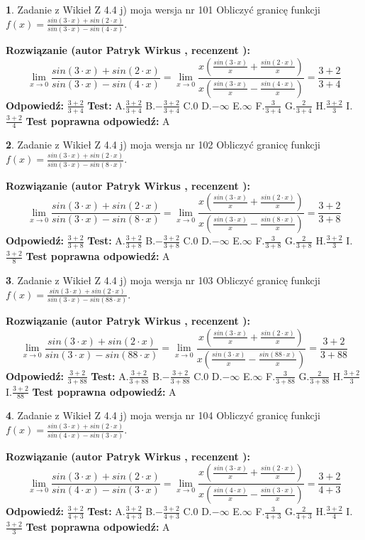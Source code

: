 \documentclass[12pt, a4paper]{article}
\theoremstyle{definition} %
\newtheorem{zad}{}
\newcommand{\zadStart}[1]{\begin{zad}#1\newline}
\newcommand{\zadStop}{\end{zad}}
\newcommand{\rozwStart}[2]{\noindent \textbf{Rozwiązanie (autor #1 , recenzent #2): }\newline}
\newcommand{\rozwStop}{\newline}
\newcommand{\odpStart}{\noindent \textbf{Odpowiedź:}\newline}
\newcommand{\odpStop}{\newline}
\newcommand{\testStart}{\noindent \textbf{Test:}\newline}
\newcommand{\testStop}{\newline}
\newcommand{\kluczStart}{\noindent \textbf{Test poprawna odpowiedź:}\newline}
\newcommand{\kluczStop}{\newline}
\begin{document}
\zadStart{Zadanie z Wikieł Z 4.4 j) moja wersja nr 101}
Obliczyć granicę funkcji $f(x)=\frac{sin(3\cdot x) +sin(2\cdot x)}{sin(3\cdot x) -sin(4\cdot x)}$.
\zadStop
\rozwStart{Patryk Wirkus}{}
$$\lim\limits_{x\to 0}\frac{sin(3\cdot x) +sin(2\cdot x)}{sin(3\cdot x) -sin(4\cdot x)}=\lim\limits_{x\to 0}\frac{x(\frac{sin(3\cdot x)}{x}+\frac{sin(2\cdot x)}{x})}{x(\frac{sin(3\cdot x)}{x}-\frac{sin(4\cdot x)}{x})}=\frac{3+2}{3+4}$$
\rozwStop
\odpStart
$\frac{3+2}{3+4}$
\odpStop
\testStart
A.$\frac{3+2}{3+4}$
B.$-\frac{3+2}{3+4}$
C.$0$
D.$-\infty$
E.$\infty$
F.$\frac{3}{3+4}$
G.$\frac{2}{3+4}$
H.$\frac{3+2}{3}$
I.$\frac{3+2}{4}$
\testStop
\kluczStart
A
\kluczStop



\zadStart{Zadanie z Wikieł Z 4.4 j) moja wersja nr 102}
Obliczyć granicę funkcji $f(x)=\frac{sin(3\cdot x) +sin(2\cdot x)}{sin(3\cdot x) -sin(8\cdot x)}$.
\zadStop
\rozwStart{Patryk Wirkus}{}
$$\lim\limits_{x\to 0}\frac{sin(3\cdot x) +sin(2\cdot x)}{sin(3\cdot x) -sin(8\cdot x)}=\lim\limits_{x\to 0}\frac{x(\frac{sin(3\cdot x)}{x}+\frac{sin(2\cdot x)}{x})}{x(\frac{sin(3\cdot x)}{x}-\frac{sin(8\cdot x)}{x})}=\frac{3+2}{3+8}$$
\rozwStop
\odpStart
$\frac{3+2}{3+8}$
\odpStop
\testStart
A.$\frac{3+2}{3+8}$
B.$-\frac{3+2}{3+8}$
C.$0$
D.$-\infty$
E.$\infty$
F.$\frac{3}{3+8}$
G.$\frac{2}{3+8}$
H.$\frac{3+2}{3}$
I.$\frac{3+2}{8}$
\testStop
\kluczStart
A
\kluczStop



\zadStart{Zadanie z Wikieł Z 4.4 j) moja wersja nr 103}
Obliczyć granicę funkcji $f(x)=\frac{sin(3\cdot x) +sin(2\cdot x)}{sin(3\cdot x) -sin(88\cdot x)}$.
\zadStop
\rozwStart{Patryk Wirkus}{}
$$\lim\limits_{x\to 0}\frac{sin(3\cdot x) +sin(2\cdot x)}{sin(3\cdot x) -sin(88\cdot x)}=\lim\limits_{x\to 0}\frac{x(\frac{sin(3\cdot x)}{x}+\frac{sin(2\cdot x)}{x})}{x(\frac{sin(3\cdot x)}{x}-\frac{sin(88\cdot x)}{x})}=\frac{3+2}{3+88}$$
\rozwStop
\odpStart
$\frac{3+2}{3+88}$
\odpStop
\testStart
A.$\frac{3+2}{3+88}$
B.$-\frac{3+2}{3+88}$
C.$0$
D.$-\infty$
E.$\infty$
F.$\frac{3}{3+88}$
G.$\frac{2}{3+88}$
H.$\frac{3+2}{3}$
I.$\frac{3+2}{88}$
\testStop
\kluczStart
A
\kluczStop



\zadStart{Zadanie z Wikieł Z 4.4 j) moja wersja nr 104}
Obliczyć granicę funkcji $f(x)=\frac{sin(3\cdot x) +sin(2\cdot x)}{sin(4\cdot x) -sin(3\cdot x)}$.
\zadStop
\rozwStart{Patryk Wirkus}{}
$$\lim\limits_{x\to 0}\frac{sin(3\cdot x) +sin(2\cdot x)}{sin(4\cdot x) -sin(3\cdot x)}=\lim\limits_{x\to 0}\frac{x(\frac{sin(3\cdot x)}{x}+\frac{sin(2\cdot x)}{x})}{x(\frac{sin(4\cdot x)}{x}-\frac{sin(3\cdot x)}{x})}=\frac{3+2}{4+3}$$
\rozwStop
\odpStart
$\frac{3+2}{4+3}$
\odpStop
\testStart
A.$\frac{3+2}{4+3}$
B.$-\frac{3+2}{4+3}$
C.$0$
D.$-\infty$
E.$\infty$
F.$\frac{3}{4+3}$
G.$\frac{2}{4+3}$
H.$\frac{3+2}{4}$
I.$\frac{3+2}{3}$
\testStop
\kluczStart
A
\kluczStop
\end{document}
